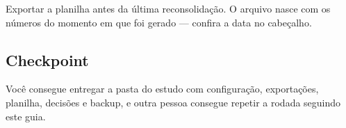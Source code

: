 \begin{alerta}
Exportar a planilha antes da última reconsolidação. O arquivo nasce com os números do momento em que
foi gerado --- confira a data no cabeçalho.
\end{alerta}

\subsection*{Checkpoint}
\marcador\; Você consegue entregar a pasta do estudo com configuração, exportações, planilha, decisões e
backup, e outra pessoa consegue repetir a rodada seguindo este guia.
